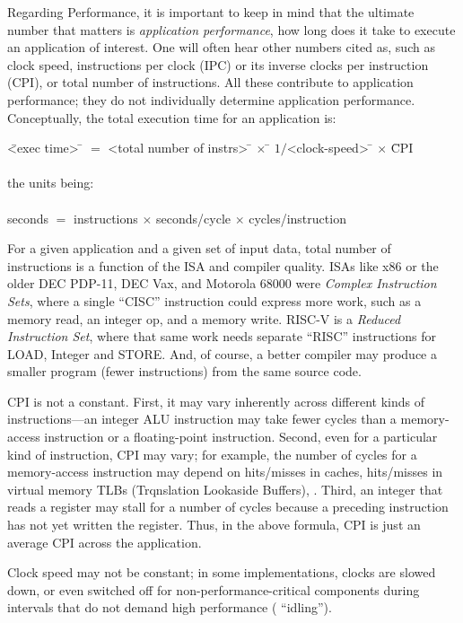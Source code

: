 Regarding Performance, it is important to keep in mind that the
ultimate number that matters is \emph{application performance}, {\ie}
how long does it take to execute an application of interest. One will
often hear other numbers cited as, such as clock speed, instructions
per clock (IPC) or its inverse clocks per instruction (CPI), or total
number of instructions.  All these contribute to application
performance; they do not individually determine application
performance.  Conceptually, the total execution time for an
application is:

\begin{tabbing}
\hmmm \= <exec time> \= $=$ <total number of instrs> \hm \= $\times$ \= $1/$<clock-speed> \hm \= $\times$ \= CPI \\
\\
\hm the units being: \\
\\
      \> seconds     \> $=$ instructions                 \> $\times$ \> seconds/cycle         \> $\times$ \> cycles/instruction
\end{tabbing}

For a given application and a given set of input data, total number of
instructions is a function of the ISA and compiler quality.  ISAs like
x86 or the older DEC PDP-11, DEC Vax, and Motorola 68000 were
\emph{Complex Instruction Sets}, where a single ``CISC'' instruction
could express more work, such as a memory read, an integer op, and a
memory write.  RISC-V is a \emph{Reduced Instruction Set}, where that
same work needs separate ``RISC'' instructions for LOAD, Integer and
STORE.  And, of course, a better compiler may produce a smaller
program (fewer instructions) from the same source code.

CPI is not a constant.  First, it may vary inherently across different
kinds of instructions---an integer ALU instruction may take fewer
cycles than a memory-access instruction or a floating-point
instruction.  Second, even for a particular kind of instruction, CPI
may vary; for example, the number of cycles for a memory-access
instruction may depend on hits/misses in caches, hits/misses in
virtual memory TLBs (Trqnslation Lookaside Buffers), {\etc}.  Third,
an integer that reads a register may stall for a number of cycles
because a preceding instruction has not yet written the register.
Thus, in the above formula, CPI is just an average CPI across the
application.

Clock speed may not be constant; in some implementations, clocks are
slowed down, or even switched off for non-performance-critical
components during intervals that do not demand high performance ({\eg}
``idling'').

